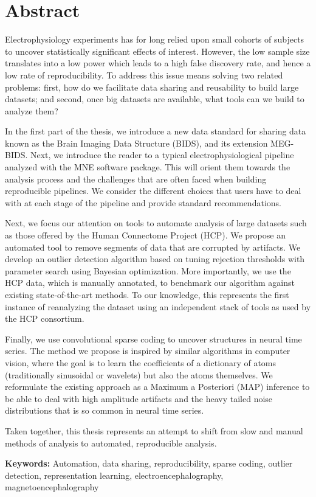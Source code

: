 \chapter*{Abstract}

Electrophysiology experiments has for long relied upon small cohorts of subjects to uncover statistically significant effects of interest. However, the low sample size translates into a low power which leads to a high false discovery rate, and hence a low rate of reproducibility. To address this issue means solving two related problems: first, how do we  facilitate data sharing and reusability to build large datasets; and second, once big datasets are available, what tools can we build to analyze them?

In the first part of the thesis, we introduce a new data standard for sharing data known as the Brain Imaging Data Structure (BIDS), and its extension MEG-BIDS. Next, we introduce the reader to a typical electrophysiological pipeline analyzed with the MNE software package. This will orient them towards the analysis process and the challenges that are often faced when building reproducible pipelines. We consider the different choices that users have to deal with at each stage of the pipeline and provide standard recommendations.

Next, we focus our attention on tools to automate analysis of large datasets such as those offered by the Human Connectome Project (HCP). We propose an automated tool to remove segments of data that are corrupted by artifacts. We develop an outlier detection algorithm based on tuning rejection thresholds with parameter search using Bayesian optimization. More importantly, we use the HCP data, which is manually annotated, to benchmark our algorithm against existing state-of-the-art methods. To our knowledge, this represents the first instance of reanalyzing the dataset using an independent stack of tools as used by the HCP consortium.

Finally, we use convolutional sparse coding to uncover structures in neural time series. The method we propose is inspired by similar algorithms in computer vision, where the goal is to learn the coefficients of a dictionary of atoms (traditionally sinusoidal or wavelets) but also the atoms themselves. We reformulate the existing approach as a Maximum a Posteriori (MAP) inference to be able to deal with high amplitude artifacts and the heavy tailed noise distributions that is so common in neural time series. 

Taken together, this thesis represents an attempt to shift from slow and manual methods of analysis to automated, reproducible analysis.

\textbf{Keywords:} Automation, data sharing, reproducibility, sparse coding, outlier detection, representation learning, electroencephalography, magnetoencephalography